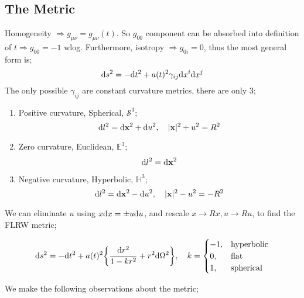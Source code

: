 \subsection{The Metric}
Homogeneity $\Rightarrow g_{\mu \nu} = g_{\mu \nu}(t)$. So $g_{00}$ component can be absorbed into definition of $t \Rightarrow g_{00} = -1$ wlog. Furthermore, isotropy $\Rightarrow g_{0i} = 0$, thus the most general form is;
\begin{equation}
\text{d} s^2 = -\text{d} t^2 + a(t)^2 \gamma_{ij} \text{d} x^i \text{d} x^j
\end{equation}
The only possible $\gamma_{ij}$ are constant curvature metrics, there are only $3$;
\begin{enumerate}
\item Positive curvature, Spherical, $\mathcal{S}^3$;
\begin{equation}
\text{d} l^2 = \text{d} \mathbf{x}^2 + \text{d} u^2, \quad |\mathbf x|^2 + u^2 = R^2 
\end{equation}
\item Zero curvature, Euclidean, $\mathbb{E}^3$;
\begin{equation}
\text{d} l^2 = \text{d} \mathbf{x}^2
\end{equation}
\item Negative curvature, Hyperbolic, $\mathbb{H}^3$;
\begin{equation}
\text{d} l^2 = \text{d} \mathbf{x}^2 - \text{d} u^2, \quad |\mathbf x|^2 - u^2 = -R^2
\end{equation}
\end{enumerate}
We can eliminate $u$ using $x\text{d} x = \pm u \text{d} u$, and rescale $x \rightarrow Rx, u \rightarrow Ru$, to find the FLRW metric;
\begin{examplebox}
\begin{equation}
\ud s^2 = -\ud t^2 + a(t)^2 \left\{\frac{\ud r^2}{1-kr^2} + r^2 \ud \Omega^2\right\}, \quad k = 
      \begin{cases}
      -1, & \text{hyperbolic} \\
      0, & \text{flat} \\
      1, & \text{spherical}
      \end{cases}
\end{equation}
\end{examplebox}
We make the following observations about the metric;
